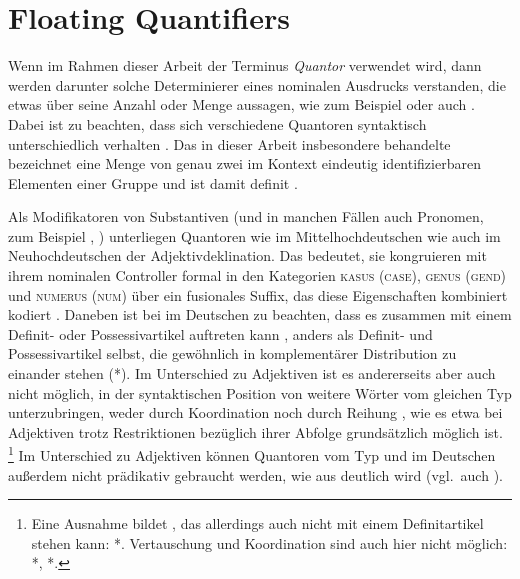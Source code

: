 \section{Floating Quantifiers}
\label{sec:floatquant}

Wenn im Rahmen dieser Arbeit der Terminus \textit{Quantor} verwendet wird, dann
werden darunter solche Determinierer eines nominalen Ausdrucks verstanden, die
etwas über seine Anzahl oder Menge aussagen, wie zum Beispiel  oder auch . Dabei ist zu beachten, dass sich verschiedene
Quantoren syntaktisch unterschiedlich verhalten
\autocites[27--28]{pittner1995}[11--12]{haspelmath1997}. Das in dieser Arbeit
insbesondere behandelte  bezeichnet eine Menge von genau zwei
im Kontext eindeutig identifizierbaren Elementen einer Gruppe
\autocite[vgl.][307]{keenan2006} und ist damit definit
\autocite[265--268]{lyons1999}.

Als Modifikatoren von Substantiven (und in manchen Fällen auch Pronomen, zum
Beispiel , ) unterliegen Quantoren wie
 im Mittelhochdeutschen wie auch 
im Neuhochdeutschen der Adjektivdeklination. Das bedeutet,
sie kongruieren mit ihrem nominalen Controller formal in den Kategorien
\textsc{kasus} (\textsc{case}), \textsc{genus} (\textsc{gend}) und
\textsc{numerus} (\textsc{num}) über ein fusionales Suffix, das diese
Eigenschaften kombiniert kodiert \autocites(vgl.~auch
,
)[181--184]{ksw2}[772]{woellstein2022}. Daneben ist bei
 im Deutschen zu beachten, dass es zusammen mit
einem Definit- oder Possessivartikel auftreten kann , anders
als Definit- und Possessivartikel selbst, die gewöhnlich in komplementärer
Distribution zu einander stehen (*). Im Unterschied zu
Adjektiven ist es andererseits aber auch nicht möglich, in der syntaktischen
Position von  weitere Wörter vom gleichen Typ unterzubringen, weder
durch Koordination  noch durch Reihung
, wie es etwa bei Adjektiven trotz Restriktionen
bezüglich ihrer Abfolge grundsätzlich möglich ist.%
%
	\footnote{Eine Ausnahme bildet , das allerdings auch nicht
		mit einem Definitartikel stehen kann: *.
		Vertauschung und Koordination sind auch hier nicht möglich: *, *.%
	}
%
Im Unterschied zu Adjektiven können Quantoren vom Typ  und 
im Deutschen außerdem nicht prädikativ gebraucht werden, wie
aus  deutlich wird (vgl.~auch \cite[181,
Anm.~1]{merchant1996}).

